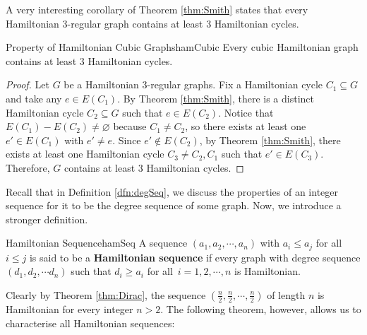 \documentclass[math]{amznotes}
\theoremstyle{remark}
\begin{document}
A very interesting corollary of Theorem \ref{thm:Smith} states that every Hamiltonian $3$-regular graph contains at least $3$ Hamiltonian cycles.
\begin{corbox}{Property of Hamiltonian Cubic Graphs}{hamCubic}
    Every cubic Hamiltonian graph contains at least $3$ Hamiltonian cycles.
    \tcblower
    \begin{proof}
        Let $G$ be a Hamiltonian $3$-regular graphs. Fix a Hamiltonian cycle $C_1 \subseteq G$ and take any $e \in E(C_1)$. By Theorem \ref{thm:Smith}, there is a distinct Hamiltonian cycle $C_2 \subseteq G$ such that $e \in E(C_2)$. Notice that $E(C_1) - E(C_2) \neq \varnothing$ because $C_1 \neq C_2$, so there exists at least one $e' \in E(C_1)$ with $e' \neq e$. Since $e' \notin E(C_2)$, by Theorem \ref{thm:Smith}, there exists at least one Hamiltonian cycle $C_3 \neq C_2, C_1$ such that $e' \in E(C_3)$. Therefore, $G$ contains at least $3$ Hamiltonian cycles.
    \end{proof}
\end{corbox}
Recall that in Definition \ref{dfn:degSeq}, we discuss the properties of an integer sequence for it to be the degree sequence of some graph. Now, we introduce a stronger definition.
\begin{dfnbox}{Hamiltonian Sequence}{hamSeq}
    A sequence $(a_1, a_2, \cdots, a_n)$ with $a_i \leq a_j$ for all $i \leq j$ is said to be a {\color{red} \textbf{Hamiltonian sequence}} if every graph with degree sequence $(d_1, d_2, \cdots d_n)$ such that $d_i \geq a_i$ for all~$i = 1, 2, \cdots, n$ is Hamiltonian.
\end{dfnbox}
Clearly by Theorem \ref{thm:Dirac}, the sequence $\left(\frac{n}{2}, \frac{n}{2}, \cdots, \frac{n}{2}\right)$ of length $n$ is Hamiltonian for every integer $n > 2$. The following theorem, however, allows us to characterise all Hamiltonian sequences:
\end{document}
